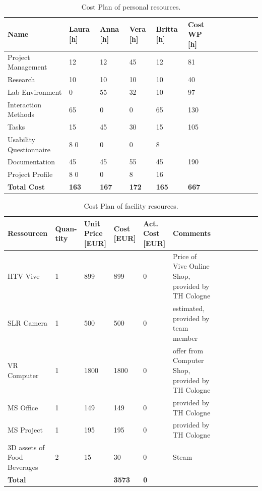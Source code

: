 \begin{table}[H]
	\centering
	\begin{tabular}{|p{5cm}|p{1.5 cm}|p{1 cm}|p{1cm}|p{1.5 cm}|p{2 cm}| l l l l l l }
		\hline
		\Absatzbox{}
	\textbf{Name}&	\textbf{Laura [h]} &\textbf{Anna [h]} &	\textbf{Vera [h]} &\textbf{	Britta [h]} &	\textbf{Cost WP [h]} \\ \hline
	Project Management &	12&	12&	45&	12&	81\\ \hline
	Research&	10	&10	&10&	10	&40\\ \hline
	Lab Environment&	0&	55&	32	&10&	97\\ \hline
	Interaction Methods	&65&	0&	0&	65	&130\\ \hline
	Tasks	&15&	45	&30&	15&	105\\ \hline
	Usability Questionnaire	&8	0&	0&	0&	8\\ \hline
	Documentation	&45	&45&	55&	45&	190\\ \hline
	Project Profile	&8	0&	0&	8&	16\\ \hline
	\textbf{Total Cost}	&\textbf{163}&	\textbf{167}	&\textbf{172}&	\textbf{165}	&\textbf{667}\\ \hline
	
	\end{tabular}
	\caption[]{Cost Plan of personal resources.}
	\label{tab:Personal Cost Plan}
\end{table}

\begin{table}[H]
	\centering
	\begin{tabular}{|p{3cm}|p{1 cm}|p{1.5 cm}|p{1.5cm}|p{1.5 cm}|p{3.5 cm}| l l l l l l }
		\hline
		\Absatzbox{}
		\textbf{Ressourcen}	&\textbf{Quan- tity}&	\textbf{Unit Price [EUR]}&	\textbf{Cost [EUR]}&\textbf{Act. Cost [EUR]}&\textbf{Comments} \\ \hline
			 HTV Vive &	1	&899&	899&	0	&Price of Vive Online Shop, provided by TH Cologne\\ \hline
			 SLR Camera&	1	&500&	500&	0	&estimated, provided by team member\\ \hline
			 VR Computer&	1	&1800&	1800	&0	&offer from Computer Shop, provided by TH Cologne\\ \hline
			 MS Office	&1	&149&	149&	0&	provided by TH Cologne\\ \hline
			MS Project&	1	&195&	195&	0&	provided by TH Cologne\\ \hline
			3D assets of Food Beverages&	2&	15&	30&	0	&Steam\\ \hline
	\textbf{Total}	&	& &	\textbf{3573}	&\textbf{0}	&\\ \hline
		
	
	\end{tabular}
	\caption[]{Cost Plan of facility resources.}
	\label{tab:facility Cost Plan}
\end{table}


